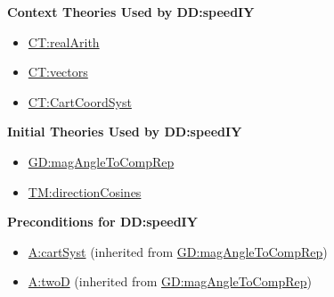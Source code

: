 \documentclass[12pt]{article}
\begin{document}
\noindent \textbf{Context Theories Used by DD:speedIY}

\begin{itemize}
\item \hyperref[CT:realArith]{CT:realArith}
\item \hyperref[CT:vectors]{CT:vectors}
\item \hyperref[CT:CartCoordSyst]{CT:CartCoordSyst}
\end{itemize}

\noindent \textbf{Initial Theories Used by DD:speedIY}

\begin{itemize}
\item \hyperref[GD:magAngleToCompRep]{GD:magAngleToCompRep}
\item \hyperref[TM:directionCosines]{TM:directionCosines}
\end{itemize}

\noindent \textbf{Preconditions for DD:speedIY}

\begin{itemize}
\item \hyperref[cartSyst]{A:cartSyst} (inherited from \hyperref[GD:magAngleToCompRep]{GD:magAngleToCompRep})
\item \hyperref[twoD]{A:twoD} (inherited from \hyperref[GD:magAngleToCompRep]{GD:magAngleToCompRep})
\end{itemize}
\end{document}
